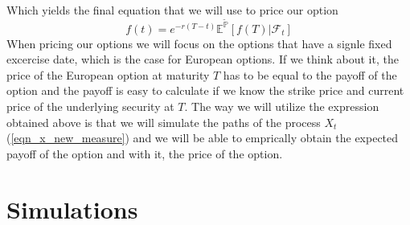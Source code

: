 \documentclass[times, utf8, diplomski]{fer}
\begin{document}
Which yields the final equation that we will use to price our option
\begin{equation}
f(t) = e^{-r(T-t)} \mathbb{E}^{\tilde{\mathbb{P}}}[f(T)|\mathcal{F}_t]
\end{equation}
When pricing our options we will focus on the options that have a signle fixed excercise date, which is the case for European options. If we think about it, the price of the European option at maturity $T$ has to be equal to the payoff of the option and the payoff is easy to calculate if we know the strike price and current price of the underlying security at $T$. The way we will utilize the expression obtained above is that we will simulate the paths of the process $X_t$ (\ref{eqn_x_new_measure}) and we will be able to emprically obtain the expected payoff of the option and with it, the price of the option.




\section{Simulations}


\end{document}
